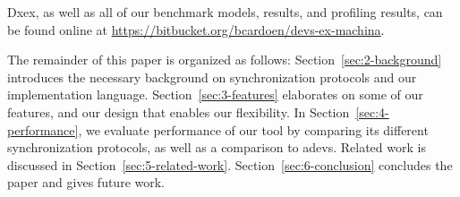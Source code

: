 Dxex, as well as all of our benchmark models, results, and profiling results, can be found online at \url{https://bitbucket.org/bcardoen/devs-ex-machina}.

The remainder of this paper is organized as follows:
Section~\ref{sec:2-background} introduces the necessary background on synchronization protocols and our implementation language.
Section~\ref{sec:3-features} elaborates on some of our features, and our design that enables our flexibility.
In Section~\ref{sec:4-performance}, we evaluate performance of our tool by comparing its different synchronization protocols, as well as a comparison to adevs.
Related work is discussed in Section~\ref{sec:5-related-work}.
Section~\ref{sec:6-conclusion} concludes the paper and gives future work.
